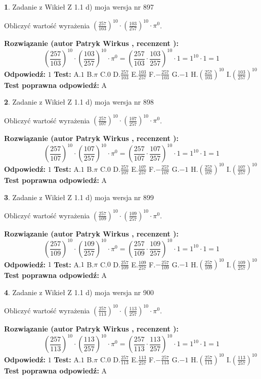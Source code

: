 \documentclass[12pt, a4paper]{article}
\theoremstyle{definition} %
\newtheorem{zad}{}
\newcommand{\zadStart}[1]{\begin{zad}#1\newline}
\newcommand{\zadStop}{\end{zad}}
\newcommand{\rozwStart}[2]{\noindent \textbf{Rozwiązanie (autor #1 , recenzent #2): }\newline}
\newcommand{\rozwStop}{\newline}
\newcommand{\odpStart}{\noindent \textbf{Odpowiedź:}\newline}
\newcommand{\odpStop}{\newline}
\newcommand{\testStart}{\noindent \textbf{Test:}\newline}
\newcommand{\testStop}{\newline}
\newcommand{\kluczStart}{\noindent \textbf{Test poprawna odpowiedź:}\newline}
\newcommand{\kluczStop}{\newline}
\begin{document}
\zadStart{Zadanie z Wikieł Z 1.1 d) moja wersja nr 897}

Obliczyć wartość wyrażenia $(\frac{257}{103})^{10} \cdot (\frac{103}{257})^{10} \cdot \pi^{0}$.
\zadStop
\rozwStart{Patryk Wirkus}{}
$$(\frac{257}{103})^{10} \cdot (\frac{103}{257})^{10} \cdot \pi^{0} = (\frac{257}{103} \cdot \frac{103}{257})^{10} \cdot 1 = 1^{10} \cdot 1 = 1$$
\rozwStop
\odpStart
$1$
\odpStop
\testStart
A.$1$ B.$\pi$ C.$0$ D.$\frac{257}{103}$ E.$\frac{103}{257}$
F.$-\frac{257}{103}$ G.$-1$
H.$(\frac{257}{103})^{10}$
I.$(\frac{103}{257})^{10}$
\testStop
\kluczStart
A
\kluczStop



\zadStart{Zadanie z Wikieł Z 1.1 d) moja wersja nr 898}

Obliczyć wartość wyrażenia $(\frac{257}{107})^{10} \cdot (\frac{107}{257})^{10} \cdot \pi^{0}$.
\zadStop
\rozwStart{Patryk Wirkus}{}
$$(\frac{257}{107})^{10} \cdot (\frac{107}{257})^{10} \cdot \pi^{0} = (\frac{257}{107} \cdot \frac{107}{257})^{10} \cdot 1 = 1^{10} \cdot 1 = 1$$
\rozwStop
\odpStart
$1$
\odpStop
\testStart
A.$1$ B.$\pi$ C.$0$ D.$\frac{257}{107}$ E.$\frac{107}{257}$
F.$-\frac{257}{107}$ G.$-1$
H.$(\frac{257}{107})^{10}$
I.$(\frac{107}{257})^{10}$
\testStop
\kluczStart
A
\kluczStop



\zadStart{Zadanie z Wikieł Z 1.1 d) moja wersja nr 899}

Obliczyć wartość wyrażenia $(\frac{257}{109})^{10} \cdot (\frac{109}{257})^{10} \cdot \pi^{0}$.
\zadStop
\rozwStart{Patryk Wirkus}{}
$$(\frac{257}{109})^{10} \cdot (\frac{109}{257})^{10} \cdot \pi^{0} = (\frac{257}{109} \cdot \frac{109}{257})^{10} \cdot 1 = 1^{10} \cdot 1 = 1$$
\rozwStop
\odpStart
$1$
\odpStop
\testStart
A.$1$ B.$\pi$ C.$0$ D.$\frac{257}{109}$ E.$\frac{109}{257}$
F.$-\frac{257}{109}$ G.$-1$
H.$(\frac{257}{109})^{10}$
I.$(\frac{109}{257})^{10}$
\testStop
\kluczStart
A
\kluczStop



\zadStart{Zadanie z Wikieł Z 1.1 d) moja wersja nr 900}

Obliczyć wartość wyrażenia $(\frac{257}{113})^{10} \cdot (\frac{113}{257})^{10} \cdot \pi^{0}$.
\zadStop
\rozwStart{Patryk Wirkus}{}
$$(\frac{257}{113})^{10} \cdot (\frac{113}{257})^{10} \cdot \pi^{0} = (\frac{257}{113} \cdot \frac{113}{257})^{10} \cdot 1 = 1^{10} \cdot 1 = 1$$
\rozwStop
\odpStart
$1$
\odpStop
\testStart
A.$1$ B.$\pi$ C.$0$ D.$\frac{257}{113}$ E.$\frac{113}{257}$
F.$-\frac{257}{113}$ G.$-1$
H.$(\frac{257}{113})^{10}$
I.$(\frac{113}{257})^{10}$
\testStop
\kluczStart
A
\kluczStop
\end{document}
